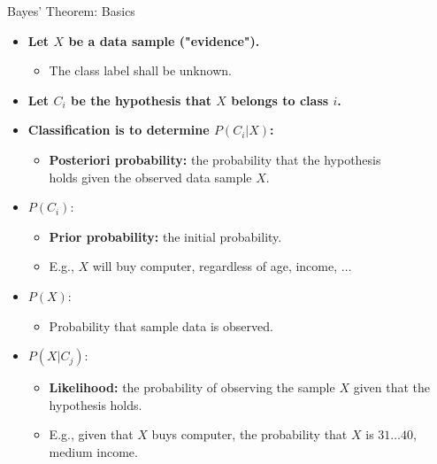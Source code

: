\begin{frame}{Bayes' Theorem: Basics}
	\begin{itemize}
		\item \textbf{Let $X$ be a data sample ("evidence").}
		      \begin{itemize}
			      \item The class label shall be unknown.
		      \end{itemize}
		\item \textbf{Let $C_i$ be the hypothesis that $X$ belongs to class $i$.}
		\item \textbf{Classification is to determine $P(C_i|X)$:}
		      \begin{itemize}
			      \item \textbf{\color{airforceblue}Posteriori probability:} the probability that the hypothesis \\ holds given the observed data sample $X$.
		      \end{itemize}
		\item $P(C_i)$:
		      \begin{itemize}
			      \item \textbf{\color{airforceblue}Prior probability:} the initial probability.
			      \item E.g., $X$ will buy computer, regardless of age, income, $\ldots$
		      \end{itemize}
		\item $P(X)$:
		      \begin{itemize}
			      \item Probability that sample data is observed.
		      \end{itemize}
		\item $P(X|C_j)$:
		      \begin{itemize}
			      \item \textbf{\color{airforceblue}Likelihood:} the probability of observing the sample $X$ given that the hypothesis holds.
			      \item E.g., given that $X$ buys computer, the probability that $X$ is $31\ldots40$, medium income.
		      \end{itemize}
	\end{itemize}
\end{frame}

